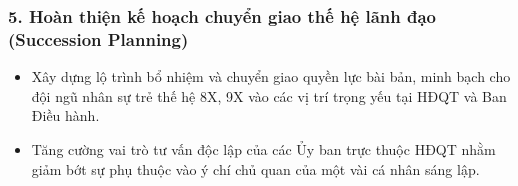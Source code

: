 \subsubsection{5. Hoàn thiện kế hoạch chuyển giao thế hệ lãnh đạo (Succession Planning)}
\begin{itemize}
    \item Xây dựng lộ trình bổ nhiệm và chuyển giao quyền lực bài bản, minh bạch cho đội ngũ nhân sự trẻ thế hệ 8X, 9X vào các vị trí trọng yếu tại HĐQT và Ban Điều hành.
    \item Tăng cường vai trò tư vấn độc lập của các Ủy ban trực thuộc HĐQT nhằm giảm bớt sự phụ thuộc vào ý chí chủ quan của một vài cá nhân sáng lập.
\end{itemize}
